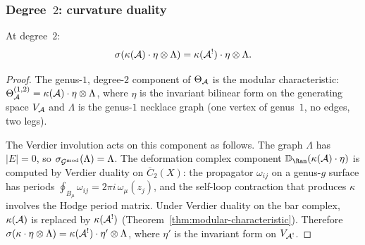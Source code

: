 \subsubsection{Degree~$2$: curvature duality}

\begin{proposition}
\label{prop:thqg-IV-kappa-duality}
At degree~$2$:
\begin{equation}\label{eq:thqg-IV-kappa-duality}
\sigma(\kappa(\mathcal{A}) \cdot \eta \otimes \Lambda)
= \kappa(\mathcal{A}^!) \cdot \eta \otimes \Lambda.
\end{equation}
\end{proposition}

\begin{proof}
The genus-$1$, degree-$2$ component of $\Theta_{\mathcal{A}}$ is the modular
characteristic:
$\Theta_{\mathcal{A}}^{(1,2)} = \kappa(\mathcal{A}) \cdot \eta \otimes \Lambda$,
where $\eta$ is the invariant bilinear form on the generating
space $V_{\mathcal{A}}$ and $\Lambda$ is the genus-$1$ necklace graph
(one vertex of genus~$1$, no edges, two legs).

The Verdier involution acts on this component as follows.
The graph $\Lambda$ has $|E| = 0$, so
$\sigma_{\mathcal{G}^{\mathrm{mod}}}(\Lambda) = \Lambda$.
The deformation complex component $\VD_{\Ran}(\kappa(\cA) \cdot \eta)$
is computed by Verdier duality on $\overline{C}_2(X)$:
the propagator $\omega_{ij}$ on a genus-$g$ surface has periods
$\oint_{B_\mu} \omega_{ij} = 2\pi i\,\omega_\mu(z_j)$, and the
self-loop contraction that produces $\kappa$ involves the Hodge period
matrix. Under Verdier duality on the bar complex,
$\kappa(\mathcal{A})$ is replaced by $\kappa(\mathcal{A}^!)$
(Theorem~\ref{thm:modular-characteristic}). Therefore
$\sigma(\kappa \cdot \eta \otimes \Lambda)
= \kappa(\mathcal{A}^!) \cdot \eta' \otimes \Lambda$,
where $\eta'$ is the invariant form on $V_{\mathcal{A}^!}$.
\end{proof}

